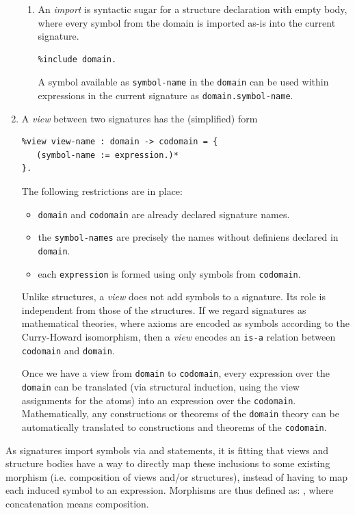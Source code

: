 \begin{enumerate}
\begin{enumerate}
	\item An \textit{import} is syntactic sugar for a structure declaration with empty body, where every symbol from the domain is imported as-is into the current signature.
\begin{verbatim}
%include domain.
\end{verbatim}
A symbol available as {\tt symbol-name} in the {\tt domain} can be used within expressions in the current signature as {\tt domain.symbol-name}.

	\end{enumerate}

\item A \textit{view} between two signatures has the (simplified) form
\begin{verbatim}
%view view-name : domain -> codomain = { 
   (symbol-name := expression.)*
}.
\end{verbatim}
	The following restrictions are in place:
	\begin{itemize}
	\item {\tt domain} and {\tt codomain} are already declared signature names.
	\item the {\tt symbol-names} are precisely the names without definiens declared in {\tt domain}.
	\item each {\tt expression} is formed using only symbols from {\tt codomain}.
	\end{itemize}
       	 Unlike structures, a \textit{view} does not add symbols to a signature. Its role is independent from those of the structures. If we regard signatures as mathematical theories, where axioms are encoded as symbols according to the Curry-Howard isomorphism, then a \textit{view} encodes an {\tt is-a} relation between {\tt codomain} and {\tt domain}.

Once we have a view from {\tt domain} to {\tt codomain}, every expression over the {\tt domain} can be translated (via structural induction, using the view assignments for the atoms) into an expression over the {\tt codomain}. Mathematically, any constructions or theorems of the {\tt domain} theory can be automatically translated to constructions and theorems of the {\tt codomain}.

\end{enumerate}

As signatures import symbols via  and  statements, it is fitting that views and structure bodies have a way to directly map these inclusions to some existing morphism (i.e. composition of views and/or structures), instead of having to map each induced symbol to an expression. Morphisms are thus defined as: , where concatenation means composition. 

